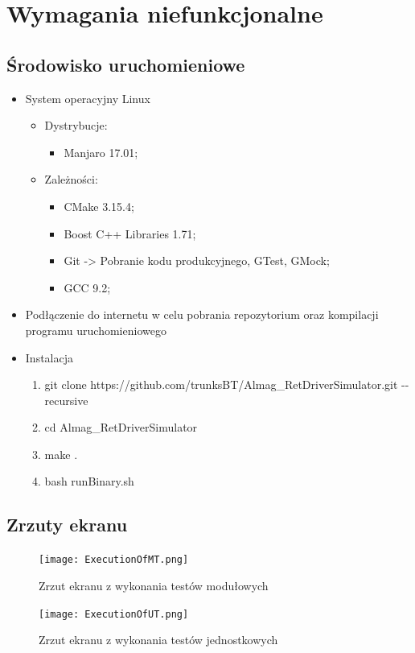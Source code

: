 \chapter{Wymagania niefunkcjonalne}
\section{Środowisko uruchomieniowe}
	\begin{itemize}
		\item System operacyjny Linux
			\begin{itemize}
				\item Dystrybucje:
				\begin{itemize}
					\item Manjaro 17.01;
				\end{itemize}
				\item Zależności:
					\begin{itemize}
						\item CMake 3.15.4;
						\item Boost C++ Libraries 1.71;
						\item Git -> Pobranie kodu produkcyjnego, GTest, GMock;
						\item GCC 9.2;
					\end{itemize}
			\end{itemize}
		\item Podłączenie do internetu w celu pobrania repozytorium oraz kompilacji programu uruchomieniowego
		\item Instalacja
		\begin{enumerate}
			\item git clone https://github.com/trunksBT/Almag\_RetDriverSimulator.git -{}-recursive
			\item cd Almag\_RetDriverSimulator
			\item make .
			\item bash runBinary.sh
		\end{enumerate}
	\end{itemize}
\section{Zrzuty ekranu}
	\begin{figure}[p]
	\texttt{[image: ExecutionOfMT.png]}
	\caption{Zrzut ekranu z wykonania testów modułowych}
	\end{figure}
	
	\begin{figure}[p]
	\texttt{[image: ExecutionOfUT.png]}
	\caption{Zrzut ekranu z wykonania testów jednostkowych}
	\end{figure}
	
